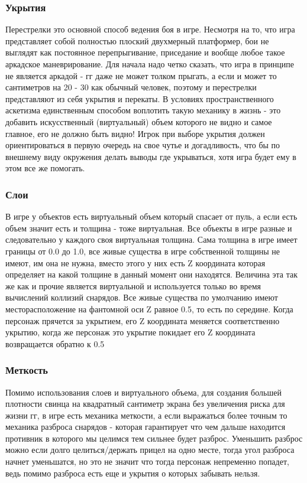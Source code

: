 \documentclass[11pt]{report}
\begin{document}
\subsubsection{Укрытия}
Перестрелки это основной способ ведения боя в игре. Несмотря на то, что игра представляет собой полностью плоский двухмерный платформер, бои не выглядят как постоянное перепрыгивание, приседание и вообще любое такое аркадское маневрирование. Для начала надо четко сказать, что игра в принципе не является аркадой - гг даже не может толком прыгать, а если и может то сантиметров на 20 - 30 как обычный человек, поэтому и перестрелки представляют из себя укрытия и перекаты. В условиях пространственного аскетизма единственным способом воплотить такую механику в жизнь - это добавить искусственный (виртуальный) объем которого не видно и самое главное, его не должно быть видно! Игрок при выборе укрытия должен ориентироваться в первую очередь на свое чутье и догадливость, что бы по внешнему виду окружения делать выводы где укрываться, хотя игра будет ему в этом все же помогать.

\subsubsection{Слои}
В игре у объектов есть виртуальный объем который спасает от пуль, а если есть объем значит есть и толщина - тоже виртуальная. Все объекты в игре разные и следовательно у каждого своя виртуальная толщина. Сама толщина в игре имеет границы от 0.0 до 1.0, все живые существа в игре собственной толщины не имеют, им она не нужна, вместо этого у них есть Z координата которая определяет на какой толщине в данный момент они находятся. Величина эта так же как и прочие является виртуальной и используется только во время вычислений коллизий снарядов. Все живые существа по умолчанию имеют месторасположение на фантомной оси Z равное 0.5, то есть по середине. Когда персонаж прячется за укрытием, его Z координата меняется соответственно укрытию, когда же персонаж это укрытие покидает его Z координата возвращается обратно к 0.5


\subsubsection{Меткость}
Помимо использования слоев и виртуального объема, для создания большей плотности свинца на квадратный сантиметр экрана без увеличения риска для жизни гг, в игре есть механика меткости, а если выражаться более точным то механика разброса снарядов - которая гарантирует что чем дальше находится противник в которого мы целимся тем сильнее будет разброс. Уменьшить разброс можно если долго целиться/держать прицел на одно месте, тогда угол разброса начнет уменьшатся, но это не значит что тогда персонаж непременно попадет, ведь помимо разброса есть еще и укрытия о которых забывать нельзя. 
\end{document}
